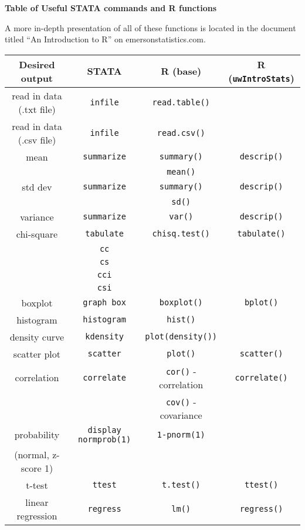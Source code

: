 \documentclass[11pt,letterpaper,fleqn]{report}
\begin{document}
\centerline{\textbf{\Large{Table of Useful STATA commands and R functions}}}
$$$$
A more in-depth presentation of all of these functions is located in the document titled ``An Introduction to R'' on emersonstatistics.com.
$$$$
\begin{centering}
\begin{tabular}{cccc}
\hline
Desired output & STATA & R (base) & R (\texttt{uwIntroStats})\\
\hline
read in data (.txt file) & \texttt{infile} & \texttt{read.table()} & \\
read in data (.csv file) & \texttt{infile} & \texttt{read.csv()} & \\
mean & \texttt{summarize} & \texttt{summary()} & \texttt{descrip()}\\
 & & \texttt{mean()} & \\
std dev &\texttt{summarize} & \texttt{summary()} & \texttt{descrip()}\\
 & & \texttt{sd()} & \\
variance & \texttt{summarize} & \texttt{var()} & \texttt{descrip()}\\
chi-square & \texttt{tabulate} & \texttt{chisq.test()} & \texttt{tabulate()}\\
 & \texttt{cc} & & \\
 & \texttt{cs} & & \\
 & \texttt{cci} & & \\
 & \texttt{csi} & & \\
boxplot & \texttt{graph box} & \texttt{boxplot()} & \texttt{bplot()}\\
histogram & \texttt{histogram} & \texttt{hist()} & \\
density curve & \texttt{kdensity} & \texttt{plot(density())} & \\
scatter plot & \texttt{scatter} & \texttt{plot()} & \texttt{scatter()}\\
correlation & \texttt{correlate} & \texttt{cor()} - correlation & \texttt{correlate()}\\
& & \texttt{cov()} - covariance & \\
probability & \texttt{display normprob(1)} & \texttt{1-pnorm(1)} & \\
(normal, z-score 1) & & & \\
t-test & \texttt{ttest} & \texttt{t.test()} & \texttt{ttest()}\\
linear regression & \texttt{regress} & \texttt{lm()} & \texttt{regress()}\\

\end{tabular}
\end{centering}
\end{document}
